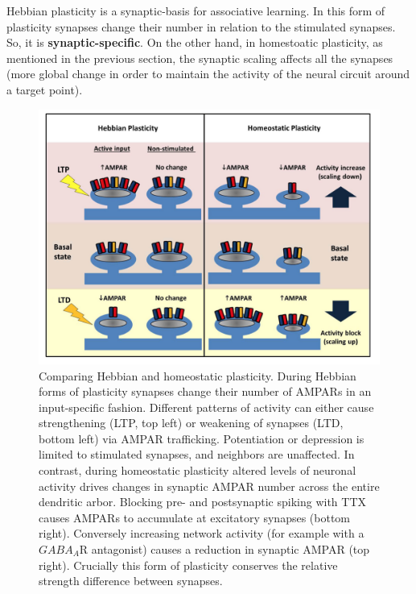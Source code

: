 \documentclass[main]{subfiles}
\begin{document}
\noindent
Hebbian plasticity is a synaptic-basis for associative learning. In this form of plasticity synapses change their number in relation to the stimulated synapses. So, it is \textbf{synaptic-specific}. On the other hand, in homestoatic plasticity, as mentioned in the previous section, the synaptic scaling affects all the synapses (more global change in order to maintain the activity of the neural circuit around a target point).

\begin{figure}[H]
    \centering
    \includegraphics[width=.9\textwidth]{03_PlasticityInTheBrain/figures/hebbian_vs_homeostatic.png}
    \caption{Comparing Hebbian and homeostatic plasticity. During Hebbian forms of plasticity synapses change their number of AMPARs in an input-specific fashion. Different patterns of activity can either cause strengthening (LTP, top left) or weakening of synapses (LTD, bottom left) via AMPAR trafficking. Potentiation or depression is limited to stimulated synapses, and neighbors are unaffected. In contrast, during homeostatic plasticity altered levels of neuronal activity drives changes in synaptic AMPAR number across the entire dendritic arbor. Blocking pre- and postsynaptic spiking with TTX causes AMPARs to accumulate at excitatory synapses (bottom right). Conversely increasing network activity (for example with a $GABA_A$R antagonist) causes a reduction in synaptic AMPAR (top right). Crucially this form of plasticity conserves the relative strength difference between synapses.}
    \label{fig:hebbian_vs_homeostatic}
\end{figure}
\end{document}
